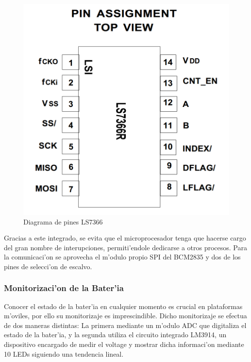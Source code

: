 \documentclass[twoside,12pt]{article}
\begin{document}
\begin{figure}[ht]
\centering
\includegraphics[scale=0.15]{images/LS7366.png} 
\caption{Diagrama de pines LS7366}
\label{fig:LS7366}
\end{figure} 

Gracias a este integrado, se evita que el microprocesador tenga que hacerse cargo del gran nombre de interupciones, permiti'endole dedicarse a otros procesos. Para la comunicaci'on se aprovecha el m'odulo propio SPI del BCM2835 y dos de los pines de selecci'on de escalvo. 

\subsubsection{Monitorizaci'on de la Bater'ia}
Conocer el estado de la bater'ia en cualquier momento es crucial en plataformas m'oviles, por ello su monitorizaje es imprescindible. Dicho monitorizaje se efectua de dos maneras distintas: La primera mediante un m'odulo ADC que digitaliza el estado de la bater'ia, y la segunda utiliza el circuito integrado LM3914, un dispositivo encargado de medir el voltage y mostrar dicha informaci'on mediante 10 LEDs siguiendo una tendencia lineal.

 


\newpage
\end{document}
